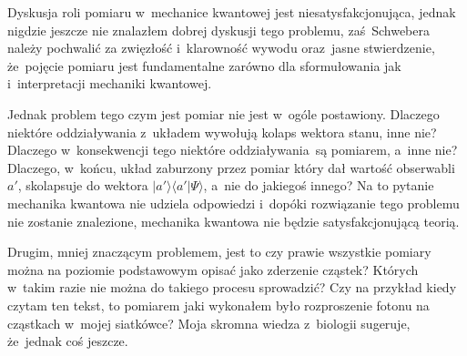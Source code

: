 \documentclass[a4paper,11pt]{article}
\begin{document}
\vspace{\spaceTwo}











\newpage


\vspace{0em}



\vspace{0em}


\noindent
{} Dyskusja roli pomiaru w~mechanice kwantowej jest
niesatysfakcjonująca, jednak nigdzie jeszcze nie znalazłem dobrej
dyskusji tego problemu, zaś~Schwebera należy pochwalić za zwięzłość
i~klarowność wywodu oraz~jasne stwierdzenie, że~pojęcie pomiaru jest
fundamentalne zarówno dla sformułowania jak i~interpretacji mechaniki
kwantowej.

Jednak problem tego czym jest pomiar nie jest w~ogóle postawiony.
Dlaczego niektóre oddziaływania z~układem wywołują kolaps wektora
stanu, inne nie? Dlaczego w~konsekwencji tego niektóre
oddziaływania~są pomiarem, a~inne nie? Dlaczego, w~końcu, układ
zaburzony przez pomiar który dał wartość obserwabli $a'$, skolapsuje
do wektora $| a' \rangle \langle a' | \Psi \rangle$, a~nie do jakiegoś
innego? Na to pytanie mechanika kwantowa nie udziela odpowiedzi
i~dopóki rozwiązanie tego problemu nie zostanie znalezione, mechanika
kwantowa nie będzie satysfakcjonującą teorią.

Drugim, mniej znaczącym problemem, jest to czy prawie wszystkie
pomiary można na poziomie podstawowym opisać jako zderzenie cząstek?
Których w~takim razie nie można do takiego procesu sprowadzić? Czy na
przykład kiedy czytam ten tekst, to pomiarem jaki wykonałem było
rozproszenie fotonu na cząstkach w~mojej siatkówce? Moja skromna
wiedza z~biologii sugeruje, że~jednak coś jeszcze.

\vspace{\spaceFour}
\end{document}
